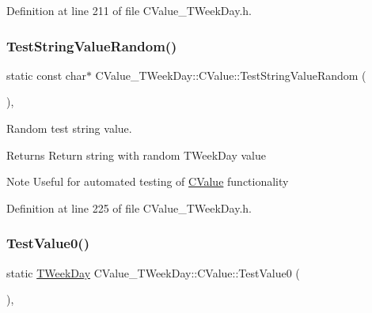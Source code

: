 Definition at line 211 of file C\+Value\+\_\+\+T\+Week\+Day.\+h.

\mbox{\label{class_c_value___t_week_day_1_1_c_value_a660e41950e476580acf00793fb43839a}} 
\subsubsection{\texorpdfstring{Test\+String\+Value\+Random()}{TestStringValueRandom()}}
{\footnotesize\ttfamily static const char$\ast$ C\+Value\+\_\+\+T\+Week\+Day\+::\+C\+Value\+::\+Test\+String\+Value\+Random (\begin{DoxyParamCaption}{ }\end{DoxyParamCaption})\hspace{0.3cm}{\ttfamily [inline]}, {\ttfamily [static]}}



Random test string value. 

\begin{DoxyReturn}{Returns}
Return string with random T\+Week\+Day value 
\end{DoxyReturn}
\begin{DoxyNote}{Note}
Useful for automated testing of \hyperlink{class_c_value___t_week_day_1_1_c_value}{C\+Value} functionality 
\end{DoxyNote}


Definition at line 225 of file C\+Value\+\_\+\+T\+Week\+Day.\+h.

\mbox{\label{class_c_value___t_week_day_1_1_c_value_ab2953ef7d3421ad741bed333e2188874}} 
\subsubsection{\texorpdfstring{Test\+Value0()}{TestValue0()}}
{\footnotesize\ttfamily static \hyperlink{namespace_c_value___t_week_day_a6412f204509f223b789fb5f1a61a6124}{T\+Week\+Day} C\+Value\+\_\+\+T\+Week\+Day\+::\+C\+Value\+::\+Test\+Value0 (\begin{DoxyParamCaption}{ }\end{DoxyParamCaption})\hspace{0.3cm}{\ttfamily [inline]}, {\ttfamily [static]}}



